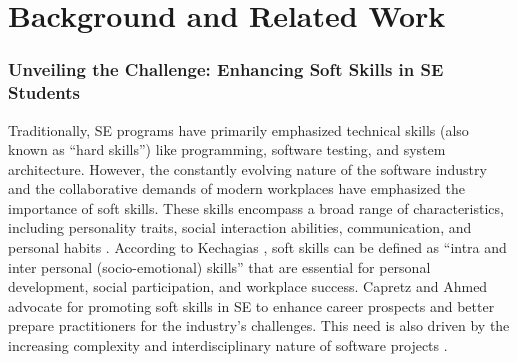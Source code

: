 \section{Background and Related Work}


\subsubsection{Unveiling the Challenge: Enhancing Soft Skills in SE Students}

Traditionally, SE programs have primarily emphasized technical skills (also known as ``hard skills'') like programming, software testing, and system architecture. However, the constantly evolving nature of the software industry and the collaborative demands of modern workplaces have emphasized the importance of soft skills. These skills encompass a broad range of characteristics, including personality traits, social interaction abilities, communication, and personal habits \cite{ahmed2012evaluating}. According to Kechagias \cite{kechagias2011teaching}, soft skills can be defined as ``intra and inter personal (socio-emotional) skills'' that are essential for personal development, social participation, and workplace success. Capretz and Ahmed \cite{capretz2018call} advocate for promoting soft skills in SE to enhance career prospects and better prepare practitioners for the industry's challenges. This need is also driven by the increasing complexity and interdisciplinary nature of software projects \cite{matturro2019systematic, miranda2021compreendendo}.





